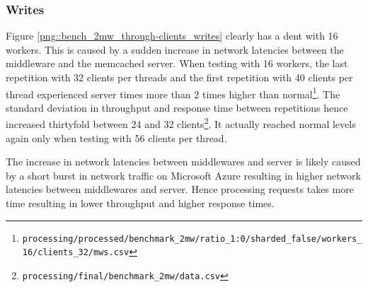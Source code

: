 \documentclass[11pt,a4paper]{article}
\begin{document}
\subsubsection{Writes}
Figure \ref{png::bench_2mw_through-clients_writes} clearly has a dent with 16 workers. This is caused by a sudden increase in network latencies between the middleware and the memcached server. When testing with 16 workers, the last repetition with 32 clients per threads and the first repetition with 40 clients per thread experienced server times more than 2 times higher than normal\footnote{\texttt{processing/processed/benchmark_2mw/ratio_1:0/sharded_false/workers_16/clients_32/mws.csv}}. The standard deviation in throughput and response time between repetitions hence increased thirtyfold between 24 and 32 clients\footnote{\texttt{processing/final/benchmark_2mw/data.csv}}. It actually reached normal levels again only when testing with 56 clients per thread.

The increase in network latencies between middlewares and server is likely caused by a short burst in network traffic on Microsoft Azure resulting in higher network latencies between middlewares and server. Hence processing requests takes more time resulting in lower throughput and higher response times.
\end{document}
